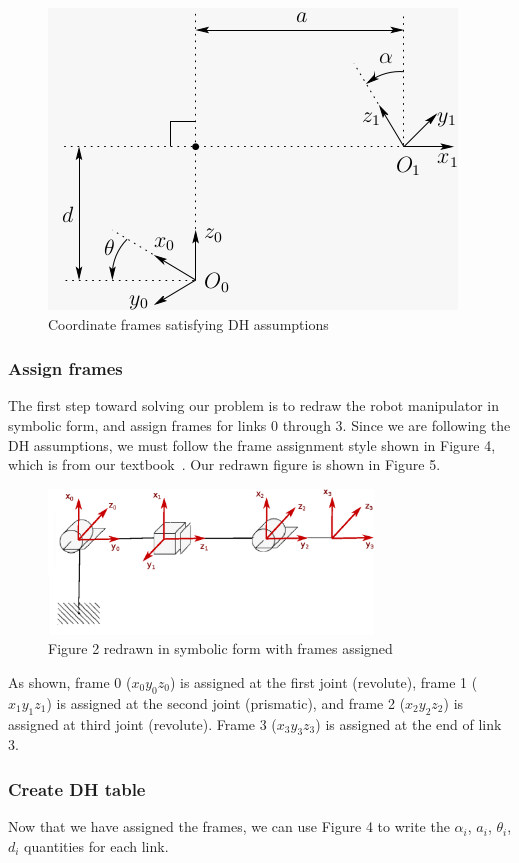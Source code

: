 \documentclass[conference]{IEEEtran}
\begin{document}
\begin{figure}[h]
    \centering
    \includegraphics[scale=0.5]{dh-frames.png}
    \caption{Coordinate frames satisfying DH assumptions}
\end{figure}
\subsubsection{Assign frames}
The first step toward solving our problem is to redraw the robot
manipulator in symbolic
form, and assign frames for links 0 through 3. Since we are following the DH assumptions,
we must follow the frame assignment style shown in Figure 4, which
is from our textbook~\cite{Spong2006}. Our redrawn figure is shown in Figure 5.\\
\begin{figure}[h!]
    \centering
    \includegraphics[width=3.4in]{prob3_5_redraw}
    \caption{Figure 2 redrawn in symbolic form with frames assigned}
\end{figure}
As shown, frame 0 ($x_0 y_0 z_0$) is assigned at the first joint (revolute), frame 1
($x_1 y_1 z_1$) is assigned at the
second joint (prismatic), and frame 2 ($x_2 y_2 z_2$)
 is assigned at third joint (revolute). Frame 3 ($x_3 y_3 z_3$) is assigned at
the end of link 3.\\

\subsubsection{Create DH table}
Now that we have assigned the frames, we can use Figure 4 to write
the $\alpha_i$, $a_i$, $\theta_i$, $d_i$ quantities for each link.
\end{document}
